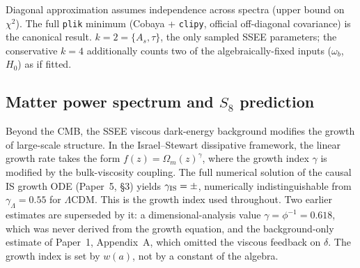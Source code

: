 \documentclass[12pt,a4paper]{article}
\newcommand{\SSEE}{\ifmmode\mathrm{SSEE}\else\textsc{ssee}\fi}
\begin{document}
\begin{table}[ht]
\centering
\caption{\textbf{Summary: CMB model selection across likelihood treatments.}
SSEE vs.\ $\Lambda$CDM BIC under evaluations of increasing rigour. All favour SSEE;
the full off-diagonal \texttt{plik} minimum $\chi^2$ of each model (\SSEE\ at the
global anchor $H_0=\val{H0_GLOBAL_d5}$, $\omega_m$-direct) is the canonical result.}
\label{tab:bic_comparison}
{\footnotesize Diagonal approximation assumes independence across spectra (upper bound on $\chi^2$).
The full \texttt{plik} minimum (Cobaya + \texttt{clipy}, official off-diagonal covariance) is the canonical result.
$k=2=\{A_s,\tau\}$, the only sampled SSEE parameters; the conservative $k=4$ additionally counts two
of the algebraically-fixed inputs ($\omega_b$, $H_0$) as if fitted.}
\end{table}

\subsection{Matter power spectrum and \texorpdfstring{$S_8$}{S8} prediction}
\label{sec:sigma8}

Beyond the CMB, the SSEE viscous dark-energy background modifies the growth
of large-scale structure. In the Israel--Stewart dissipative framework, the
linear growth rate takes the form $f(z) = \Omega_m(z)^\gamma$, where the
growth index $\gamma$ is modified by the bulk-viscosity coupling.
The full numerical solution of the causal IS growth ODE (Paper~5, \S3) yields
$\gamma_{\mathrm{IS}} = \val{p3_gamma_IS}\pm\val{p3_gamma_IS_sigma}$, numerically indistinguishable from
$\gamma_\Lambda=0.55$ for $\Lambda$CDM. This is the growth index used throughout.
Two earlier estimates are superseded by it: a dimensional-analysis value
$\gamma=\phi^{-1}=0.618$, which was never derived from the growth equation, and
the background-only estimate of Paper~1, Appendix~A, which omitted the viscous
feedback on $\delta$. The growth index is set by $w(a)$, not by a constant of
the algebra.
\end{document}
